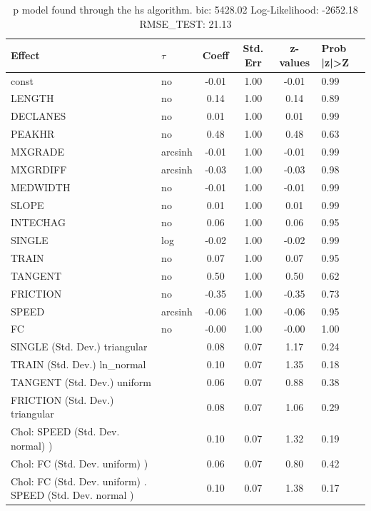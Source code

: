 \begin{table}
	\caption{p model found through the hs algorithm. bic: 5428.02 Log-Likelihood: -2652.18 RMSE_TEST: 21.13}
	\begin{center}
		\begin{tabular}{|l|l|c|c|c|l|}
			\hline
			Effect & $\tau$ & Coeff & Std. Err & z-values & Prob |z|>Z \\
			\hline
			const & no & -0.01 & 1.00 & -0.01 & 0.99 \\
			\hline
			LENGTH & no & 0.14 & 1.00 & 0.14 & 0.89 \\
			\hline
			DECLANES & no & 0.01 & 1.00 & 0.01 & 0.99 \\
			\hline
			PEAKHR & no & 0.48 & 1.00 & 0.48 & 0.63 \\
			\hline
			MXGRADE & arcsinh & -0.01 & 1.00 & -0.01 & 0.99 \\
			\hline
			MXGRDIFF & arcsinh & -0.03 & 1.00 & -0.03 & 0.98 \\
			\hline
			MEDWIDTH & no & -0.01 & 1.00 & -0.01 & 0.99 \\
			\hline
			SLOPE & no & 0.01 & 1.00 & 0.01 & 0.99 \\
			\hline
			INTECHAG & no & 0.06 & 1.00 & 0.06 & 0.95 \\
			\hline
			SINGLE & log & -0.02 & 1.00 & -0.02 & 0.99 \\
			\hline
			TRAIN & no & 0.07 & 1.00 & 0.07 & 0.95 \\
			\hline
			TANGENT & no & 0.50 & 1.00 & 0.50 & 0.62 \\
			\hline
			FRICTION & no & -0.35 & 1.00 & -0.35 & 0.73 \\
			\hline
			SPEED & arcsinh & -0.06 & 1.00 & -0.06 & 0.95 \\
			\hline
			FC & no & -0.00 & 1.00 & -0.00 & 1.00 \\
			\hline
			SINGLE (Std. Dev.) triangular &  & 0.08 & 0.07 & 1.17 & 0.24 \\
			\hline
			TRAIN (Std. Dev.) ln_normal &  & 0.10 & 0.07 & 1.35 & 0.18 \\
			\hline
			TANGENT (Std. Dev.) uniform &  & 0.06 & 0.07 & 0.88 & 0.38 \\
			\hline
			FRICTION (Std. Dev.) triangular &  & 0.08 & 0.07 & 1.06 & 0.29 \\
			\hline
			 Chol: SPEED (Std. Dev. normal) ) &  & 0.10 & 0.07 & 1.32 & 0.19 \\
			\hline
			 Chol: FC (Std. Dev. uniform) ) &  & 0.06 & 0.07 & 0.80 & 0.42 \\
			\hline
			 Chol: FC (Std. Dev. uniform) . SPEED (Std. Dev.   normal ) &  & 0.10 & 0.07 & 1.38 & 0.17 \\
			\hline
		\end{tabular}
	\end{center}
\end{table}
